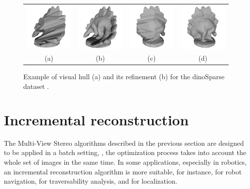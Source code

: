\begin{figure}[t]
\centering
 \begin{tabular}{cccc}
  \includegraphics[width=0.23\columnwidth]{./img/ch_soa/dinoHull01}&
  \includegraphics[width=0.23\columnwidth]{./img/ch_soa/dinoRef01}&
  \includegraphics[width=0.23\columnwidth]{./img/ch_soa/dinoHull02}&
  \includegraphics[width=0.23\columnwidth]{./img/ch_soa/dinoRef02}\\
  (a)&(b)&(c)&(d)
 \end{tabular}
 \caption{Example of visual hull (a) and its refinement (b) for the dinoSparse dataset \cite{seitz_et_al06}.}
 \label{fig:visualhullex}
\end{figure}
\section{Incremental reconstruction} 
\label{sec:incr}
The Multi-View Stereo algorithms described in the previous section are designed to be applied in a batch setting, \ie, the optimization process takes into account the whole set of images in the same time.
In some applications, especially in robotics, an incremental reconstruction algorithm is more suitable, for instance, for robot navigation, for traversability analysis, and for localization.
